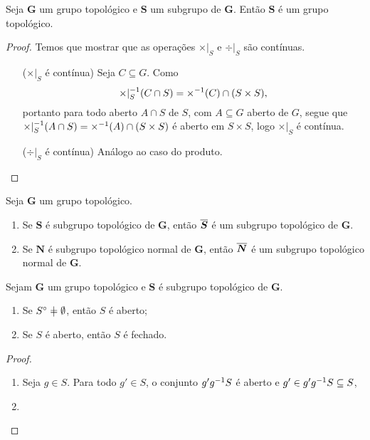 \begin{proposition}
Seja $\bm G$ um grupo topológico e $\bm S$ um subgrupo de $\bm G$. Então $\bm S$ é um grupo topológico.
\end{proposition}
\begin{proof}
Temos que mostrar que as operações $\times|_S$ e $\div|_S$ são contínuas.
	\begin{enumerate}[wide, labelwidth=!, labelindent=0pt]
	\item[($\times|_S$ é contínua)]
		Seja $C \subseteq G$. Como
		\begin{equation*}
		\times|_S ^{-1} (C \cap S) = \times ^{-1} (C) \cap (S \times S),
		\end{equation*}
		portanto para todo aberto $A \cap S$ de $S$, com $A \subseteq G$ aberto de $G$, segue que $\times|_S ^{-1} (A \cap S) = \times ^{-1} (A) \cap (S \times S)$ é aberto em $S \times S$, logo $\times|_S$ é contínua.
	\item[($\div|_S$ é contínua)]
		Análogo ao caso do produto. \qedhere
	\end{enumerate}
\end{proof}

\begin{proposition}
Seja $\bm G$ um grupo topológico.
	\begin{enumerate}
	\item Se $\bm S$ é subgrupo topológico de $\bm G$, então $\bm{\overline{S}}$ é um subgrupo topológico de $\bm G$.
	\item Se $\bm N$ é subgrupo topológico normal de $\bm G$, então $\bm{\overline{N}}$ é um subgrupo topológico normal de $\bm G$.
	\end{enumerate}
\end{proposition}

\begin{proposition}
Sejam $\bm G$ um grupo topológico e $\bm S$ é subgrupo topológico de $\bm G$.
	\begin{enumerate}
	\item Se $\Int{S} \neq \emptyset$, então $S$ é aberto;
	\item Se $S$ é aberto, então $S$ é fechado.
	\end{enumerate}
\end{proposition}
\begin{proof}
	\begin{enumerate}
		\item Seja $g \in S$. Para todo $g' \in S$, o conjunto $g'g^{-1} S$ é aberto e $g'\in g'g^{-1} S \subseteq S$, 
		\item 
		\end{enumerate}
\end{proof}

